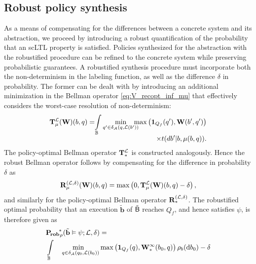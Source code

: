 \documentclass{ifacconf}
\begin{document}
\subsection{Robust policy synthesis}

As a means of compensating for the differences between a concrete system and its abstraction, we proceed by introducing a robust quantification of the probability that an scLTL property is satisfied. Policies synthesized for the abstraction with the robustified procedure can be refined to the concrete system while preserving probabilistic guarantees. A robustified synthesis procedure must incorporate both the non-determinism in the labeling function, as well as the difference $\delta$ in probability. The former can be dealt with by introducing an additional minimization in the Bellman operator \eqref{eq:V_recopt_inf_mu} that effectively considers the worst-case resolution of non-determinism:
\begin{align}
  \Bel_\pol^\Labset (\mathbf W)(b,q) = \hspace{-1mm} \int_\Xb
  \min_{q' \in \delta_\FSA(q, \Labset( b'))} \hspace{-3mm} \max \left( \mathbf 1_{Q_f}(q'), \mathbf W( b',q') \right)  \notag\\[-.4em]
   \times {\tr}(d b'|b,\pol(b,q)).\label{eq:V_recopt_nondet}
\end{align}
The policy-optimal Bellman operator ${\mathbf {T}}_\ast^{\mathcal{L}}$ is constructed analogously. Hence the robust Bellman operator follows by compensating for the difference in probability $\delta$ as
\begin{equation}
  \label{eq:V_recopt_nondet_rob}
  {\mathbf {R}}_{\mu}^{(\mathcal{L},\delta)} (\mathbf W)(b,q) = \max \left( 0, {\mathbf {T}}_{\mu}^{\mathcal{L}} (\mathbf W)(b,q) - \delta  \right),
\end{equation}
and similarly for the policy-optimal Bellman operator ${\mathbf {R}}_\ast^{(\mathcal{L}, \delta)}$. The robustified optimal probability that an execution $\tilde{\mathbf{b}}$ of $\tilde {\mathsf{B}}$ reaches $Q_f$, and hence satisfies $\psi$, is therefore given as
\begin{equation}
\label{eq:prob:robust_optimal}
\begin{aligned}
  &\mathbf{P_{\! rob}}_\init^{\!\ast} (\tilde{\mathbf{b}} \vDash \psi; \Labset,\delta) =\\ & \int_{\Xb}\  \min_{\ \ \bar q \in \delta_\FSA(q_0,\Labset(b_0))}  \max \left( \mathbf 1_{Q_f}(\bar q), \mathbf W^\infty_\ast(b_0,\bar q) \right) \initb(\mathrm{d} b_0) -\delta
\end{aligned}
\end{equation}
\end{document}
